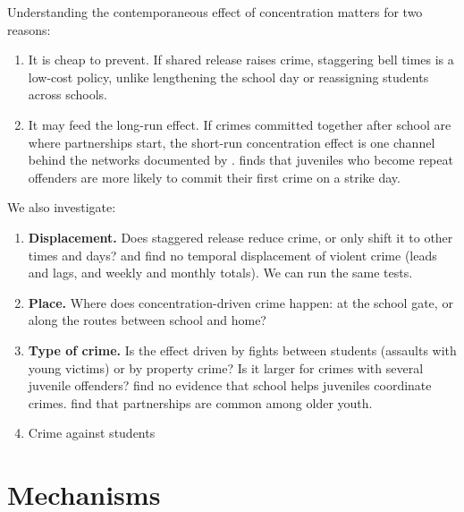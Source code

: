 Understanding the contemporaneous effect of concentration matters for two reasons:
\begin{enumerate}
  \item It is cheap to prevent. If shared release raises crime, staggering bell
        times is a low-cost policy, unlike lengthening the school day or
        reassigning students across schools.
  \item It may feed the long-run effect. If crimes committed together after
        school are where partnerships start, the short-run concentration effect
        is one channel behind the networks documented by \citet{billings2019}. \citet{luallen2006} finds that juveniles who become repeat
        offenders are more likely to commit their first crime on a strike day.
\end{enumerate}

We also investigate:
\begin{enumerate}
  \item \textbf{Displacement.} Does staggered release reduce crime, or only
        shift it to other times and days? \citet{jacob2003} and \citet{luallen2006} find no temporal displacement of violent crime (leads and lags,
        and weekly and monthly totals). We can run the same tests.
  \item \textbf{Place.} Where does concentration-driven crime happen: at the
        school gate, or along the routes between school and home?
  \item \textbf{Type of crime.} Is the effect driven by fights between students
        (assaults with young victims) or by property crime? Is it larger for
        crimes with several juvenile offenders? \citet{jacob2003} find no
        evidence that school helps juveniles coordinate crimes. \citet{billings2019} find that partnerships are common among older
        youth.
      \item Crime against students
\end{enumerate}

 \section{Mechanisms}

